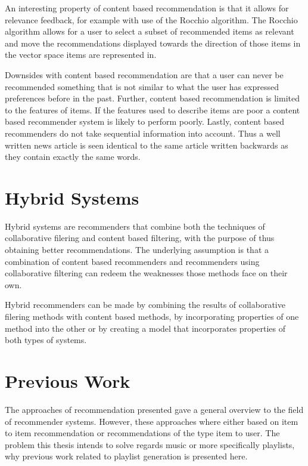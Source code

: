 \documentclass[a4paper,11pt]{kth-mag}
\begin{document}
An interesting property of content based recommendation is that it allows for relevance feedback, for example with use of the Rocchio algorithm. The Rocchio algorithm allows for a user to select a subset of recommended items as relevant and move the recommendations displayed towards the direction of those items in the vector space items are represented in\cite{pazzani2007content}.

Downsides with content based recommendation are that a user can never be recommended something that is not similar to what the user has expressed preferences before in the past. Further, content based recommendation is limited to the features of items. If the features used to describe items are poor a content based recommender system is likely to perform poorly. Lastly, content based recommenders do not take sequential information into account. Thus a well written news article is seen identical to the same article written backwards as they contain exactly the same words\cite{adomavicius2005toward}.

\section{Hybrid Systems}
Hybrid systems are recommenders that combine both the techniques of collaborative filering and content based filtering, with the purpose of thus obtaining better recommendations. The underlying assumption is that a combination of content based recommenders and recommenders using collaborative filtering can redeem the weaknesses those methods face on their own\cite{gunawardana2009unified}. 

Hybrid recommenders can be made by combining the results of collaborative filering methods with content based methods, by incorporating properties of one method into the other or by creating a model that incorporates properties of both types of systems\cite{adomavicius2005toward}.

\section{Previous Work}
The approaches of recommendation presented gave a general overview to the field of recommender systems. However, these approaches where either based on item to item recommendation or recommendations of the type item to user. The problem this thesis intends to solve regards music or more specifically playlists, why previous work related to playlist generation is presented here. 
\end{document}
